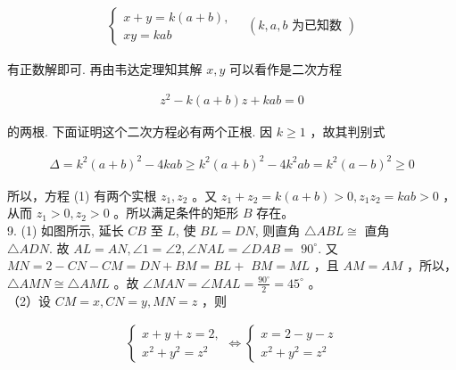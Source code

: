 \documentclass[10pt]{article}
\begin{document}
\begin{align*}
\left\{\begin{array}{l}
x+y=k(a+b), \\
x y=k a b
\end{array} \quad(k, a, b \text { 为已知数 })\right.
\end{align*}

有正数解即可. 再由韦达定理知其解 $x, y$ 可以看作是二次方程

\begin{align*}
z^{2}-k(a+b) z+k a b=0 \tag{1}
\end{align*}

的两根. 下面证明这个二次方程必有两个正根. 因 $k \geq 1$ ，故其判别式

\begin{align*}
\Delta=k^{2}(a+b)^{2}-4 k a b \geqslant k^{2}(a+b)^{2}-4 k^{2} a b=k^{2}(a-b)^{2} \geqslant 0
\end{align*}

所以，方程 (1) 有两个实根 $z_{1}, z_{2}$ 。又 $z_{1}+z_{2}=k(a+b)>0, z_{1} z_{2}=k a b>0$ ，从而 $z_{1}>0, z_{2}>0$ 。所以满足条件的矩形 $B$ 存在。\\
9. (1) 如图所示, 延长 $C B$ 至 $L$, 使 $B L=D N$, 则直角 $\triangle A B L \cong$ 直角\\
$\triangle A D N$. 故 $A L=A N, \angle 1=\angle 2, \angle N A L=\angle D A B=$ $90^{\circ}$. 又 $M N=2-C N-C M=D N+B M=B L+$ $B M=M L$ ，且 $A M=A M$ ，所以， $\triangle A M N \cong \triangle A M L$ 。故 $\angle M A N=\angle M A L=\frac{90^{\circ}}{2}=45^{\circ}$ 。\\
（2）设 $C M=x, C N=y, M N=z$ ，则

\begin{align*}
\left\{\begin{array} { l } 
{ x + y + z = 2 , } \\
{ x ^ { 2 } + y ^ { 2 } = z ^ { 2 } }
\end{array} \Leftrightarrow \left\{\begin{array}{l}
x=2-y-z \\
x^{2}+y^{2}=z^{2}
\end{array}\right.\right.
\end{align*}
\end{document}
